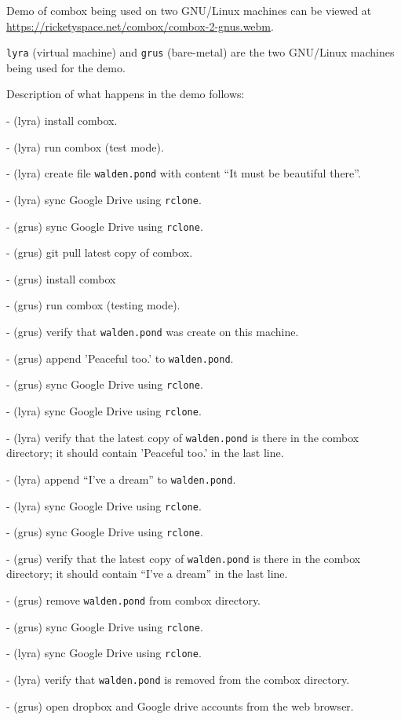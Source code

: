 Demo of combox being used on two GNU/Linux machines can be viewed at
\url{https://ricketyspace.net/combox/combox-2-gnus.webm}.

\verb+lyra+ (virtual machine) and \verb+grus+ (bare-metal) are the two
GNU/Linux machines being used for the demo.

Description of what happens in the demo follows:

 - (lyra) install combox.

 - (lyra) run combox (test mode).

 - (lyra) create file \verb+walden.pond+ with content ``It must be
 beautiful there''.

 - (lyra) sync Google Drive using \verb+rclone+.

 - (grus) sync Google Drive using \verb+rclone+.

 - (grus) git pull latest copy of combox.

 - (grus) install combox 

 - (grus) run combox (testing mode).

 - (grus) verify that \verb+walden.pond+ was create on this machine.

 - (grus) append 'Peaceful too.' to \verb+walden.pond+.

 - (grus) sync Google Drive using \verb+rclone+.

 - (lyra) sync Google Drive using \verb+rclone+.

 - (lyra) verify that the latest copy of \verb+walden.pond+ is there
 in the combox directory; it should contain 'Peaceful too.' in the
 last line.

 - (lyra) append ``I've a dream'' to \verb+walden.pond+.

 - (lyra) sync Google Drive using \verb+rclone+.

 - (grus) sync Google Drive using \verb+rclone+.

 - (grus) verify that the latest copy of \verb+walden.pond+ is there
 in the combox directory; it should contain ``I've a dream'' in the
 last line.

 - (grus) remove \verb+walden.pond+ from combox directory.

 - (grus) sync Google Drive using \verb+rclone+.

 - (lyra) sync Google Drive using \verb+rclone+.

 - (lyra) verify that \verb+walden.pond+ is removed from the combox
 directory.

 - (grus) open dropbox and Google drive accounts from the web browser.

